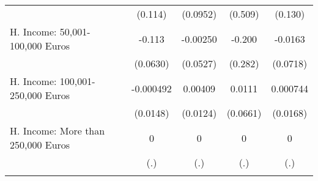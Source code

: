{\begin{tabular}{l*{4}{c}}
            &     (0.114)         &    (0.0952)         &     (0.509)         &     (0.130)         \\
[1em]
H. Income: 50,001-100,000 Euros&      -0.113         &    -0.00250         &      -0.200         &     -0.0163         \\
            &    (0.0630)         &    (0.0527)         &     (0.282)         &    (0.0718)         \\
[1em]
H. Income: 100,001-250,000 Euros&   -0.000492         &     0.00409         &      0.0111         &    0.000744         \\
            &    (0.0148)         &    (0.0124)         &    (0.0661)         &    (0.0168)         \\
[1em]
H. Income: More than 250,000 Euros&           0         &           0         &           0         &           0         \\
            &         (.)         &         (.)         &         (.)         &         (.)         \\
\hline\hline
{}\\
\end{tabular}
}
